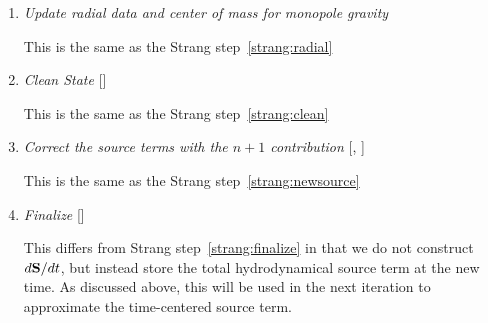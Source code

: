 \begin{enumerate}
\item {\em Update radial data and center of mass for monopole gravity}
  
  This is the same as the Strang step~\ref{strang:radial}


\item {\em Clean State} []

  This is the same as the Strang step~\ref{strang:clean}

\item \label{strang:newsource} {\em Correct the source terms with the $n+1$ contribution}
  [, ]

  This is the same as the Strang step~\ref{strang:newsource}

\item {\em Finalize} []

  This differs from Strang step~\ref{strang:finalize} in that we do not
  construct $d{\bf S}/dt$, but instead store the total hydrodynamical source
  term at the new time.  As discussed above, this will be used in the 
  next iteration to approximate the time-centered source term.

\end{enumerate}




